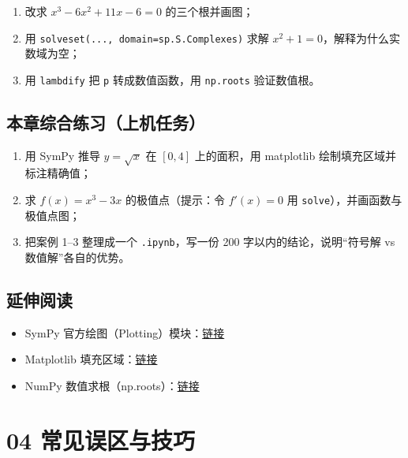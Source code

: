 \begin{enumerate}
\def\labelenumi{\arabic{enumi}.}
\tightlist
\item
  改求 \(x^3-6x^2+11x-6=0\) 的三个根并画图；
\item
  用 \texttt{solveset(...,\ domain=sp.S.Complexes)} 求解
  \(x^2+1=0\)，解释为什么实数域为空；
\item
  用 \texttt{lambdify} 把 \texttt{p} 转成数值函数，用 \texttt{np.roots}
  验证数值根。
\end{enumerate}

\subsection{本章综合练习（上机任务）}\label{ux672cux7ae0ux7efcux5408ux7ec3ux4e60ux4e0aux673aux4efbux52a1-1}

\begin{enumerate}
\def\labelenumi{\arabic{enumi}.}
\tightlist
\item
  用 SymPy 推导 \(y=\sqrt{x}\) 在 \([0,4]\) 上的面积，用 matplotlib
  绘制填充区域并标注精确值；
\item
  求 \(f(x)=x^3-3x\) 的极值点（提示：令 \(f'(x)=0\) 用
  \texttt{solve}），并画函数与极值点图；
\item
  把案例 1--3 整理成一个 \texttt{.ipynb}，写一份 200
  字以内的结论，说明``符号解 vs 数值解''各自的优势。
\end{enumerate}

\subsection{延伸阅读}\label{ux5ef6ux4f38ux9605ux8bfb-8}

\begin{itemize}
\tightlist
\item
  SymPy
  官方绘图（Plotting）模块：\href{https://docs.sympy.org/latest/modules/plotting.html}{链接}
\item
  Matplotlib
  填充区域：\href{https://matplotlib.org/stable/api/_as_gen/matplotlib.pyplot.fill_between.html}{链接}
\item
  NumPy
  数值求根（np.roots）：\href{https://numpy.org/doc/stable/reference/generated/numpy.roots.html}{链接}
\end{itemize}

\section{04
常见误区与技巧}\label{ux5e38ux89c1ux8befux533aux4e0eux6280ux5de7-1}


